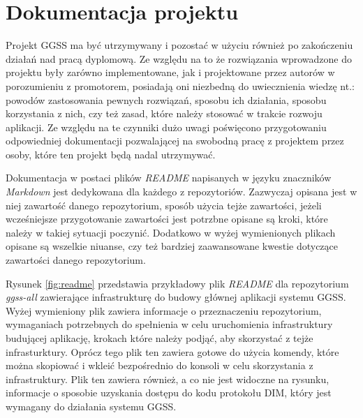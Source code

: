 \newpage
\section{Dokumentacja projektu}

Projekt GGSS ma być utrzymywany i pozostać w użyciu również po zakończeniu działań nad pracą dyplomową. Ze względu na to że rozwiązania wprowadzone do projektu były zarówno implementowane, jak i projektowane przez autorów w porozumieniu z promotorem, posiadają oni niezbedną do uwiecznienia wiedzę nt.: powodów zastosowania pewnych rozwiązań, sposobu ich działania, sposobu korzystania z nich, czy też zasad, które należy stosować w trakcie rozwoju aplikacji. Ze względu na te czynniki dużo uwagi poświęcono przygotowaniu odpowiedniej dokumentacji pozwalającej na swobodną pracę z projektem przez osoby, które ten projekt będą nadal utrzymywać.

Dokumentacja w postaci plików \emph{README} napisanych w języku znaczników \emph{Markdown} jest dedykowana dla każdego z repozytoriów. Zazwyczaj opisana jest w niej zawartość danego repozytorium, sposób użycia tejże zawartości, jeżeli wcześniejsze przygotowanie zawartości jest potrzbne opisane są kroki, które należy w takiej sytuacji poczynić. Dodatkowo w wyżej wymienionych plikach opisane są wszelkie niuanse, czy też bardziej zaawansowane kwestie dotyczące zawartości danego repozytorium.

Rysunek \ref{fig:readme} przedstawia przykładowy plik \emph{README} dla repozytorium \emph{ggss-all} zawierające infrastrukturę do budowy głównej aplikacji systemu GGSS. Wyżej wymieniony plik zawiera informacje o przeznaczeniu repozytorium, wymaganiach potrzebnych do spełnienia w celu uruchomienia infrastruktury budującej aplikację, krokach które należy podjąć, aby skorzystać z tejże infrasturktury. Oprócz tego plik ten zawiera gotowe do użycia komendy, które można skopiować i wkleić bezpośrednio do konsoli w celu skorzystania z infrastruktury. Plik ten zawiera również, a co nie jest widoczne na rysunku, informacje o sposobie uzyskania dostępu do kodu protokołu DIM, który jest wymagany do działania systemu GGSS.



